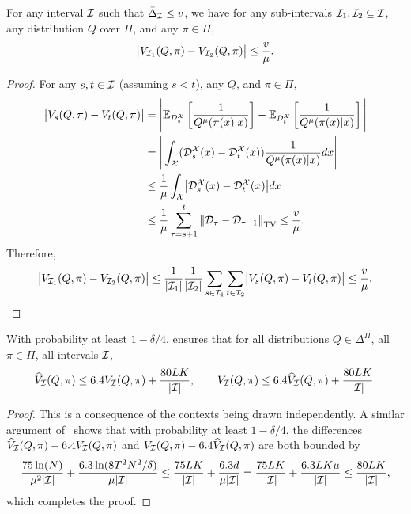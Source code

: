 \begin{lemma}\label{lemma:variation and TVD}
For any interval ${\mathcal{I}}$ such that $\bar{\Delta}_{\mathcal{I}}\leq v$, we have for any sub-intervals ${\mathcal{I}}_1, {\mathcal{I}}_2\subseteq {\mathcal{I}}$, any distribution $Q$ over $\Pi$, and any $\pi\in\Pi$, 
\begin{align*}
\big\lvert V_{{\mathcal{I}}_1}(Q,\pi)-V_{{\mathcal{I}}_2}(Q,\pi)\big\rvert \leq \frac{v}{\mu}.
\end{align*}
\end{lemma}
\begin{proof}
For any $s,t\in{\mathcal{I}}$ (assuming $s<t$), any $Q$, and $\pi\in\Pi$, 
\begin{align*}
\bigabs{V_s(Q,\pi)-V_t(Q,\pi)} 
& = \Bigg\vert\E_{\calD_s^\calX} \left[ \frac{1}{Q^\mu(\pi(x)|x)}\right] - \E_{\calD_t^\calX}\left[ \frac{1}{Q^\mu(\pi(x)|x)}\right]\Bigg\vert \\
& = \Bigg\vert \int_{\calX} (\calD_s^\calX(x)-\calD_t^\calX(x)) \frac{1}{Q^\mu(\pi(x)|x)}dx \Bigg\vert \\
& \leq \frac{1}{\mu} \int_\calX \bigabs{\calD_s^\calX(x)-\calD_t^\calX(x)}dx \\
& \leq \frac{1}{\mu} \sum_{\tau=s+1}^t \TVD{\calD_\tau - \calD_{\tau-1}} \leq \frac{v}{\mu}. 
\end{align*}
Therefore, 
\begin{align*}
\bigabs{V_{\calI_1}(Q,\pi) - V_{\calI_2}(Q,\pi)} \leq \frac{1}{\abs{\calI_1}}\frac{1}{\abs{\calI_2}} \sum_{s\in\calI_1}\sum_{t\in\calI_2}\bigabs{V_s(Q,\pi)-V_t(Q,\pi)}\leq \frac{v}{\mu}. 
\end{align*}

\end{proof}


\begin{lemma}\label{lem:variance_deviation2}
With probability at least $1 - \delta/4$, \AdaILTCB ensures that for all distributions $Q \in \Delta^\Pi$,
all $\pi \in \Pi$, all intervals ${\mathcal{I}}$,
\begin{equation}\label{eq:variance_deviation2}
\widehat{V}_{{\mathcal{I}}}(Q, \pi) \leq 6.4 V_{\mathcal{I}}(Q, \pi) + \frac{80 LK}{|{\mathcal{I}}|},
\qquad
V_{\mathcal{I}}(Q, \pi) \leq 6.4 \widehat{V}_{{\mathcal{I}}}(Q, \pi)  + \frac{80 LK}{|{\mathcal{I}}|}.
\end{equation}
\end{lemma}
\begin{proof}
This is a consequence of the contexts being drawn independently. A
similar argument of~\citep[Lemma 10]{AgarwalHsKaLaLiSc14} shows that
with probability at least $1 - \delta/4$, the differences
$\widehat{V}_{{\mathcal{I}}}(Q, \pi) - 6.4 V_{\mathcal{I}}(Q, \pi)$ and $V_{\mathcal{I}}(Q, \pi) -
6.4 \widehat{V}_{{\mathcal{I}}}(Q, \pi)$ are both bounded by
\[
\frac{75\ln(N)}{\mu^2 |{\mathcal{I}}|} + \frac{6.3\ln(8T^2N^2/\delta)}{\mu|{\mathcal{I}}|}
\leq \frac{75 LK}{|{\mathcal{I}}|} + \frac{6.3d}{\mu|{\mathcal{I}}|}
= \frac{75 LK}{|{\mathcal{I}}|} + \frac{6.3 LK\mu}{|{\mathcal{I}}|}
\leq \frac{80 LK}{|{\mathcal{I}}|},
\]
which completes the proof.
\end{proof}

